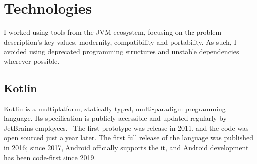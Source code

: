 \chapter{Technologies}

I worked using tools from the JVM-ecosystem, focusing on the problem description's key values, modernity, compatibility and portability. As such, I avoided using deprecated programming structures and unstable dependencies wherever possible.


\section{Kotlin }

Kotlin is a multiplatform, statically typed, multi-paradigm programming language. Its specification is publicly accessible and updated regularly by JetBrains employees.~\cite{KotlinSpec} The first prototype was release in 2011, and the code was open sourced just a year later. The first full release of the language was published in 2016; since 2017, Android officially supports the it, and Android development has been code-first since 2019.~\cite{KotlinPast}



